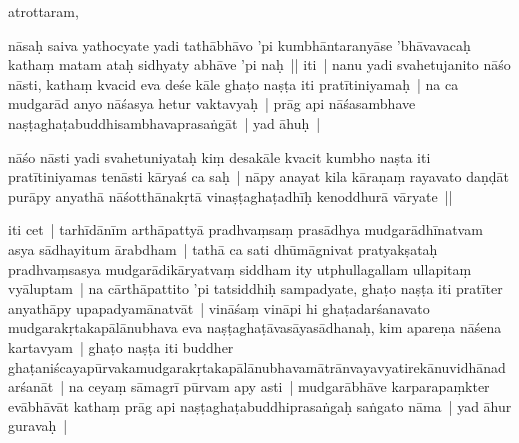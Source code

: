 \documentclass[article,12pt,a4paper]{memoir}%
\newcounter{parCount}
\begin{document}
	  
	  \pstart \leavevmode%
	atrottaram,
	{}
	\pend%
      

	  
	  \pstart \leavevmode%
	nāsaḥ saiva yathocyate yadi tathābhāvo 'pi kumbhāntaranyāse 'bhāvavacaḥ kathaṃ matam ataḥ sidhyaty abhāve 'pi naḥ || iti |  \label{thakur75-119.16} nanu yadi svahetujanito nāśo nāsti, kathaṃ kvacid eva deśe kāle ghaṭo naṣṭa iti pratītiniyamaḥ | na ca mudgarād anyo nāśasya hetur vaktavyaḥ | prāg api nāśasambhave naṣṭaghaṭabuddhisambhavaprasaṅgāt | yad āhuḥ |
	{}
	\pend%
      

	  
	  \pstart \leavevmode%
	nāśo nāsti yadi svahetuniyataḥ kiṃ desakāle kvacit kumbho naṣta iti pratītiniyamas tenāsti kāryaś ca saḥ | nāpy anayat kila kāraṇaṃ rayavato daṇḍāt purāpy anyathā nāśotthānakṛtā vinaṣṭaghaṭadhīḥ kenoddhurā vāryate || 
	{}
	\pend%
      

	  
	  \pstart \leavevmode%
	iti cet | \label{thakur75-119.23} tarhīdānīm arthāpattyā pradhvaṃsaṃ prasādhya mudgarādhīnatvam asya sādhayitum ārabdham | tathā ca sati dhūmāgnivat pratyakṣataḥ pradhvaṃsasya mudgarādikāryatvaṃ siddham ity utphullagallam ullapitaṃ vyāluptam | \label{thakur75-119.26} na cārthāpattito 'pi tatsiddhiḥ sampadyate, ghaṭo naṣṭa iti pratīter anyathāpy upapadyamānatvāt | vināśaṃ vināpi hi ghaṭadarśanavato mudgarakṛtakapālānubhava eva naṣṭaghaṭāvasāyasādhanaḥ, kim apareṇa nāśena kartavyam | ghaṭo naṣṭa iti buddher ghaṭaniścayapūrvakamudgarakṛtakapālānubhavamātrānvayavyatirekānuvidhānadarśanāt | \label{thakur75-119.29} na ceyaṃ sāmagrī pūrvam apy asti | mudgarābhāve karparapaṃkter evābhāvāt kathaṃ prāg api naṣṭaghaṭabuddhiprasaṅgaḥ saṅgato nāma | \label{thakur75-119.31} yad āhur guravaḥ |
	{}
	\pend%
      
\end{document}
